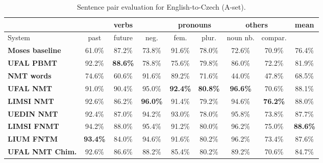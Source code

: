 \documentclass[11pt,letterpaper,final,nohyperref]{article}
\begin{document}
\begin{table*}[tb] %
\begin{center}
\small
\begin{tabular}{ l|ccc|cc|cc||c } 
\hline
&  \multicolumn{3}{c}{\textbf{verbs}} & \multicolumn{2}{c}{\textbf{pronouns}}  & \multicolumn{2}{c}{\textbf{others}}  & \multicolumn{1}{c}{\textbf{mean}}\\
\hline
System & past & future & neg. & fem. & plur. & noun nb. & compar. & \\
\hline
\textbf{Moses baseline} & 61.0\% & 87.2\% & 73.8\% & 91.6\% & 78.0\% & 72.6\% & 70.9\% & 76.4\% \\
\textbf{UFAL PBMT}      & 92.2\% & \textbf{88.6\%} & 78.8\% & 75.6\% & 79.8\% & 86.0\% & 72.2\% & 81.9\% \\ 
\textbf{NMT words}      & 74.6\% & 60.6\% & 91.6\% & 89.2\% & 71.6\% & 44.0\% & 47.8\% & 68.5\% \\
\textbf{UFAL NMT}       & 91.0\% & 90.4\% & 95.0\% & \textbf{92.4\%} & \textbf{80.8\%} & \textbf{96.6\%} & 70.6\% & 88.1\% \\
\textbf{LIMSI NMT}      & 92.6\% & 86.2\% & \textbf{96.0\%} & 91.4\% & 79.2\% & 94.6\% & \textbf{76.2\%} & 88.0\% \\ 
\textbf{UEDIN NMT}      & 92.4\% & 87.0\% & 94.2\% & 93.0\% & 78.0\% & 95.8\% & 73.8\% & 87.7\% \\
\textbf{LIMSI FNMT}     & 94.2\% & 88.0\% & 95.4\% & 91.2\% & 80.0\% & 96.2\% & 75.0\% & \textbf{88.6\%} \\
\textbf{LIUM FNTM}      & \textbf{93.4\%} & 84.0\% & 94.6\% & 91.6\% & 80.2\% & 96.2\% & 73.4\% & 87.6\% \\
\textbf{UFAL NMT Chim.} & 92.6\% & 86.6\% & 88.2\% & 85.4\% & 80.2\% & 89.2\% & 70.6\% & 84.7\% \\
\hline
 \end{tabular} 
\caption{\label{table:eval_cs_A} Sentence pair evaluation for English-to-Czech (A-set).}
\end{center}
\end{table*}
\end{document}
